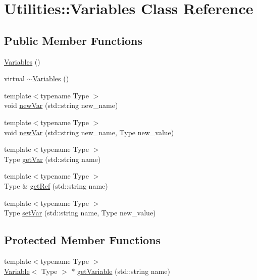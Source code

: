 \hypertarget{classUtilities_1_1Variables}{}\section{Utilities\+:\+:Variables Class Reference}
\label{classUtilities_1_1Variables}
\subsection*{Public Member Functions}
\begin{DoxyCompactItemize}
\item 
\hyperlink{classUtilities_1_1Variables_a60ebf236218fbefc48cb35e6dcabb2d6}{Variables} ()
\item 
virtual \hyperlink{classUtilities_1_1Variables_a4a67d0d360d70d7a928be6fe48c6753b}{$\sim$\+Variables} ()
\item 
{\footnotesize template$<$typename Type $>$ }\\void \hyperlink{classUtilities_1_1Variables_a7763fc000f45ef3956d61fdf2f783130}{new\+Var} (std\+::string new\+\_\+name)
\item 
{\footnotesize template$<$typename Type $>$ }\\void \hyperlink{classUtilities_1_1Variables_a67029a527f5810a298fc6538b6a634d2}{new\+Var} (std\+::string new\+\_\+name, Type new\+\_\+value)
\item 
{\footnotesize template$<$typename Type $>$ }\\Type \hyperlink{classUtilities_1_1Variables_adff493c2ea6249294a35204fd6b3f852}{get\+Var} (std\+::string name)
\item 
{\footnotesize template$<$typename Type $>$ }\\Type \& \hyperlink{classUtilities_1_1Variables_a94ddcf8aa7cd6c60b8e611c006bc3e6d}{get\+Ref} (std\+::string name)
\item 
{\footnotesize template$<$typename Type $>$ }\\Type \hyperlink{classUtilities_1_1Variables_ad5f59cff15b008435763a81bdac8bcf3}{set\+Var} (std\+::string name, Type new\+\_\+value)
\end{DoxyCompactItemize}
\subsection*{Protected Member Functions}
\begin{DoxyCompactItemize}
\item 
{\footnotesize template$<$typename Type $>$ }\\\hyperlink{classUtilities_1_1Variable}{Variable}$<$ Type $>$ $\ast$ \hyperlink{classUtilities_1_1Variables_ad02aa6b33771710e786c7b881928a5fd}{get\+Variable} (std\+::string name)
\end{DoxyCompactItemize}

